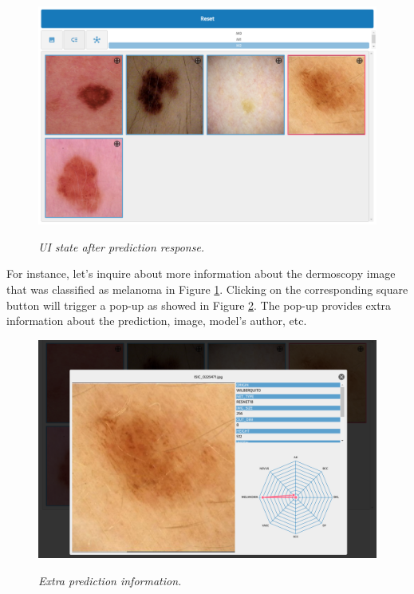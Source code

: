 \begin{figure}[H]
  \centering
  \begin{adjustbox}{width=0.9\textwidth, trim={0cm 3.55cm 0cm 0cm}, clip}
    \includegraphics[width=\textwidth]{imatges/results/after-prediction.png}
  \end{adjustbox}
  \caption[UI state after prediction response]{\textit{UI state after prediction response.}}
  {\label{fig:after-prediction}}
\end{figure}


For instance, let's inquire about more information about the dermoscopy image
that was classified as melanoma in Figure \ref{fig:after-prediction}. Clicking
on the corresponding square button will trigger a pop-up as showed in Figure
\ref{fig:extra-inf-popup}. The pop-up provides extra information about the
prediction, image, model's author, etc.

\begin{figure}[H]
  \centering
  \begin{adjustbox}{width=0.9\textwidth, trim={0.05cm 0cm 0.25cm 0cm}, clip}
    \includegraphics[]{imatges/results/extra-inf-popup.png}
  \end{adjustbox}
  \caption[Extra prediction information]{\textit{Extra prediction information.}}
  {\label{fig:extra-inf-popup}}
\end{figure}



